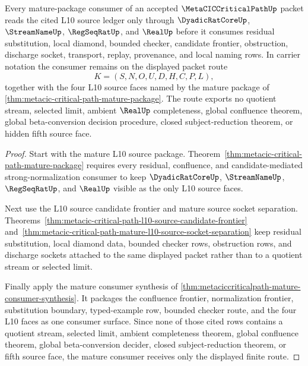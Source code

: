 \begin{theorem}
\label{thm:metacic-critical-path-mature-package-consumer}
Every mature-package consumer of an accepted $\MetaCICCriticalPathUp$ packet reads the cited L10 source ledger only through $\DyadicRatCoreUp$, $\StreamNameUp$, $\RegSeqRatUp$, and $\RealUp$ before it consumes residual substitution, local diamond, bounded checker, candidate frontier, obstruction, discharge socket, transport, replay, provenance, and local naming rows. In carrier notation the consumer remains on the displayed packet route
$$
K=(S,N,O,U,D,H,C,P,L),
$$
together with the four L10 source faces named by the mature package of \autoref{thm:metacic-critical-path-mature-package}. The route exports no quotient stream, selected limit, ambient $\RealUp$ completeness, global confluence theorem, global beta-conversion decision procedure, closed subject-reduction theorem, or hidden fifth source face.
\end{theorem}
\begin{proof}
Start with the mature L10 source package. Theorem~\ref{thm:metacic-critical-path-mature-package} requires every residual, confluence, and candidate-mediated strong-normalization consumer to keep $\DyadicRatCoreUp$, $\StreamNameUp$, $\RegSeqRatUp$, and $\RealUp$ visible as the only L10 source faces.

Next use the L10 source candidate frontier and mature source socket separation. Theorems~\ref{thm:metacic-critical-path-l10-source-candidate-frontier} and~\ref{thm:metacic-critical-path-mature-l10-source-socket-separation} keep residual substitution, local diamond data, bounded checker rows, obstruction rows, and discharge sockets attached to the same displayed packet rather than to a quotient stream or selected limit.

Finally apply the mature consumer synthesis of \autoref{thm:metaciccriticalpath-mature-consumer-synthesis}. It packages the confluence frontier, normalization frontier, substitution boundary, typed-example row, bounded checker route, and the four L10 faces as one consumer surface. Since none of those cited rows contains a quotient stream, selected limit, ambient completeness theorem, global confluence theorem, global beta-conversion decider, closed subject-reduction theorem, or fifth source face, the mature consumer receives only the displayed finite route.
\end{proof}
